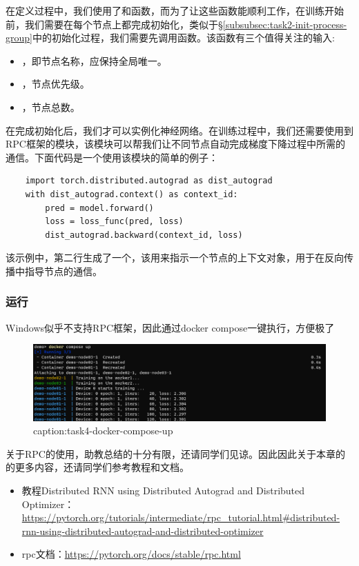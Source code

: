 在定义过程中，我们使用了和函数，而为了让这些函数能顺利工作，在训练开始前，我们需要在每个节点上都完成初始化，类似于\S\ref{subsubsec:task2-init-process-group}中的初始化过程，我们需要先调用函数。该函数有三个值得关注的输入:
\begin{itemize}
    \item {}，即节点名称，应保持全局唯一。
    \item {}，节点优先级。
    \item {}，节点总数。
\end{itemize}

在完成初始化后，我们才可以实例化神经网络。在训练过程中，我们还需要使用到RPC框架的模块，该模块可以帮我们让不同节点自动完成梯度下降过程中所需的通信。下面代码是一个使用该模块的简单的例子：
\begin{lstlisting}
    import torch.distributed.autograd as dist_autograd
    with dist_autograd.context() as context_id:
        pred = model.forward()
        loss = loss_func(pred, loss)
        dist_autograd.backward(context_id, loss)
\end{lstlisting}

该示例中，第二行生成了一个，该用来指示一个节点的上下文对象，用于在反向传播中指导节点的通信。

\subsubsection{运行}

Windows似乎不支持RPC框架，因此通过docker compose一键执行，方便极了~


\begin{figure}[htbp]
	\centering
	\includegraphics[width=1\textwidth]{figures/task4-docker-compose-up.png}
	\caption{caption:task4-docker-compose-up}
	\label{fig:task4-docker-compose-up}
\end{figure}


关于RPC的使用，助教总结的十分有限，还请同学们见谅。因此因此关于本章的的更多内容，还请同学们参考教程和文档。

\begin{itemize}
    \item 教程Distributed RNN using Distributed Autograd and Distributed Optimizer：\url{https://pytorch.org/tutorials/intermediate/rpc_tutorial.html#distributed-rnn-using-distributed-autograd-and-distributed-optimizer}
    \item rpc文档：\url{https://pytorch.org/docs/stable/rpc.html}
\end{itemize}





